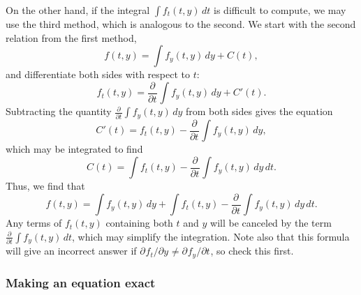 \documentclass{myart}
\newcommand{\pderiv}[3][]{\frac{\partial^{#1}#2}{\partial#3^{#1}}}
\newcommand{\fpderiv}[3][]{\partial^{#1}#2/\partial#3^{#1}}
\begin{document}
On the other hand, if the integral $\int f_t(t, y) \,dt$ is difficult to compute, we may use the third method, which is analogous to the second. We start with the second relation from the first method,
\begin{equation*}
f(t, y) = \int f_y(t, y) \,dy + C(t),
\end{equation*}
and differentiate both sides with respect to $t$:
\begin{equation*}
f_t(t, y) = \pderiv{}{t} \int f_y(t, y) \,dy + C'(t).
\end{equation*}
Subtracting the quantity $\pderiv{}{t} \int f_y(t, y) \,dy$ from both sides gives the equation
\begin{equation*}
C'(t) = f_t(t, y) - \pderiv{}{t} \int f_y(t, y) \,dy,
\end{equation*}
which may be integrated to find
\begin{equation*}
C(t) = \int f_t(t, y) - \pderiv{}{t} \int f_y(t, y) \,dy \,dt.
\end{equation*}
Thus, we find that
\begin{equation*}
f(t, y) = \int f_y(t, y) \,dy + \int f_t(t, y) - \pderiv{}{t} \int f_y(t, y) \,dy \,dt.
\end{equation*}
Any terms of $f_t(t, y)$ containing both $t$ and $y$ will be canceled by the term $\pderiv{}{t} \int f_y(t, y) \,dt$, which may simplify the integration. Note also that this formula will give an incorrect answer if $\fpderiv{f_t}{y} \neq \fpderiv{f_y}{t}$, so check this first.

\subsubsection{Making an equation exact} \label{subsubsec:making an equation exact}
\end{document}
